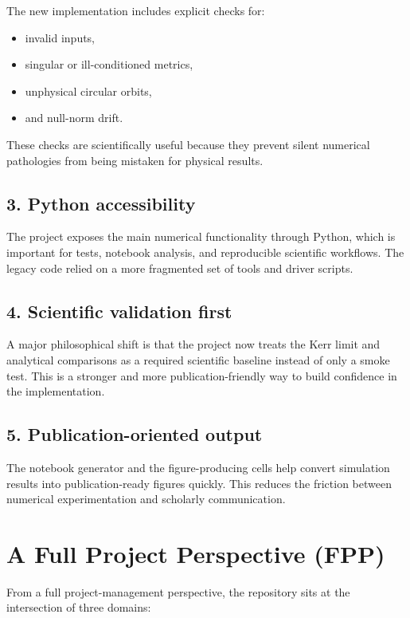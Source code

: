 \documentclass[11pt]{article}
\begin{document}
The new implementation includes explicit checks for:

\begin{itemize}[leftmargin=1.5em]
    \item invalid inputs,
    \item singular or ill-conditioned metrics,
    \item unphysical circular orbits,
    \item and null-norm drift.
\end{itemize}

These checks are scientifically useful because they prevent silent numerical pathologies from being mistaken for physical results.

\subsection{3. Python accessibility}

The project exposes the main numerical functionality through Python, which is important for tests, notebook analysis, and reproducible scientific workflows. The legacy code relied on a more fragmented set of tools and driver scripts.

\subsection{4. Scientific validation first}

A major philosophical shift is that the project now treats the Kerr limit and analytical comparisons as a required scientific baseline instead of only a smoke test. This is a stronger and more publication-friendly way to build confidence in the implementation.

\subsection{5. Publication-oriented output}

The notebook generator and the figure-producing cells help convert simulation results into publication-ready figures quickly. This reduces the friction between numerical experimentation and scholarly communication.

\section{A Full Project Perspective (FPP)}

From a full project-management perspective, the repository sits at the intersection of three domains:
\end{document}
